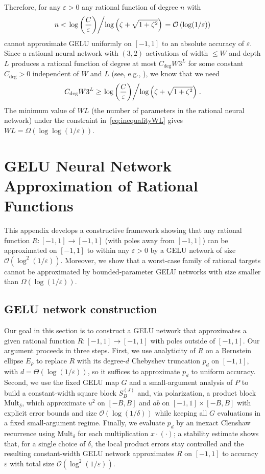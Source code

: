 \documentclass{article}
\theoremstyle{plain}
\theoremstyle{definition}
\theoremstyle{remark}
\begin{document}
Therefore, for any $\varepsilon>0$ any rational function of degree $n$ with
\[
n < \left.\log\left(\frac{C}{\varepsilon}\right) \middle/ \log\left(\zeta+\sqrt{1+\zeta^2}\right)\right. = \mathcal{O}\left(\log(1/\varepsilon)\right) 
\]
cannot approximate GELU uniformly on $[-1,1]$ to an absolute accuracy of $\varepsilon$. Since a rational neural network with $(3,2)$ activations of width $\leq W$ and depth $L$ produces a rational function of degree at most $C_{\deg} W 3^{L}$ for some constant $C_{\deg}>0$ independent of $W$ and $L$ (see, e.g., \cite{boulle2020rational}), we know that we need
\begin{equation}
C_{\deg} W 3^{L}\geq \left.\log\left(\frac{C}{\varepsilon}\right) \middle/ \log\left(\zeta+\sqrt{1+\zeta^2}\right)\right..
\label{eq:inequalityWL}
\end{equation}
The minimum value of $WL$ (the number of parameters in the rational neural network) under the constraint in~\cref{eq:inequalityWL} gives $WL = \Omega\left(\log\log(1/\varepsilon)\right)$. 


\section{GELU Neural Network Approximation of Rational Functions}
\label{app:gelu}

 {This appendix develops a constructive framework showing that any rational function $R:[-1,1]\to[-1,1]$ (with poles away from $[-1,1]$) can be approximated on $[-1,1]$ to within any $\varepsilon>0$ by a GELU network of size $\mathcal{O}(\log^2(1/\varepsilon))$. Moreover, we show that a worst-case family of rational targets cannot be approximated by bounded-parameter GELU networks with size smaller than $\Omega(\log(1/\varepsilon))$.}

\subsection*{GELU network construction}
Our goal in this section is to construct a GELU network that approximates a given rational function $R:[-1,1]\to[-1,1]$ with poles outside of $[-1,1]$. Our argument proceeds in three steps. First, we use analyticity of $R$ on a Bernstein ellipse $E_\rho$ to replace $R$ with its degree-$d$ Chebyshev truncation $p_d$ on $[-1,1]$, with $d=\Theta(\log(1/\varepsilon))$, so it suffices to approximate $p_d$ to uniform accuracy. Second, we use the fixed GELU map $G$ and a small-argument analysis of $P$ to build a constant-width square block $S_B^{(J)}$ and, via polarization, a product block $\mathrm{Mult}_\delta$, which approximate $u^2$ on $[-B,B]$ and $ab$ on $[-1,1]\times[-B,B]$ with explicit error bounds and size $\mathcal{O}(\log(1/\delta))$ while keeping all $G$ evaluations in a fixed small-argument regime. Finally, we evaluate $p_d$ by an inexact Clenshaw recurrence using $\mathrm{Mult}_\delta$ for each multiplication $x\cdot(\cdot)$; a stability estimate shows that, for a single choice of $\delta$, the local product errors stay controlled and the resulting constant-width GELU network approximates $R$ on $[-1,1]$ to accuracy $\varepsilon$ with total size $\mathcal{O}(\log^2(1/\varepsilon))$.
\end{document}
